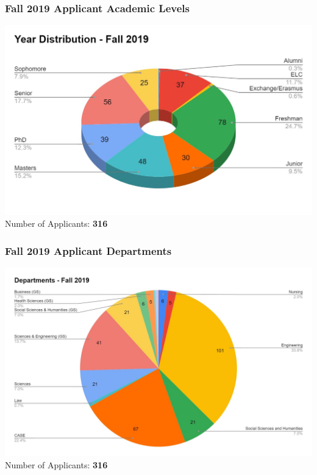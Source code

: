       
      \begin{frame}
        \frametitle{Fall 2019 Applicant Academic Levels}
        \centering
        \includegraphics[height=0.75\textheight]{images/year_distribution_fall2019.jpg}
        \LARGE
        \\
        Number of Applicants: \textbf{316}
      \end{frame}

      \begin{frame}
        \frametitle{Fall 2019 Applicant Departments}
        \centering
        \includegraphics[height=0.75\textheight]{images/departments_fall2019.jpg}
        \LARGE
        \\
        Number of Applicants: \textbf{316}
      \end{frame}

